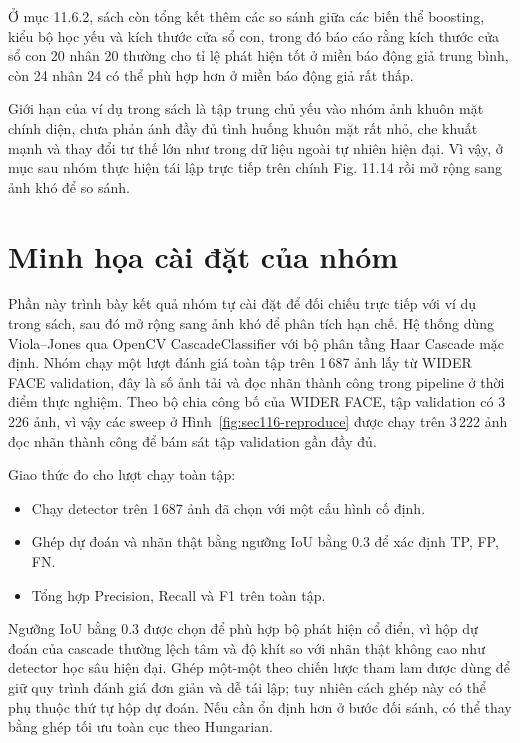 Ở mục 11.6.2, sách còn tổng kết thêm các so sánh giữa các biến thể boosting, kiểu bộ học yếu và kích thước cửa sổ con,
trong đó báo cáo rằng kích thước cửa sổ con 20 nhân 20 thường cho tỉ lệ phát hiện tốt ở miền báo động giả trung bình,
còn 24 nhân 24 có thể phù hợp hơn ở miền báo động giả rất thấp.  \cite{li2012facechapter}

Giới hạn của ví dụ trong sách là tập trung chủ yếu vào nhóm ảnh khuôn mặt chính diện,
chưa phản ánh đầy đủ tình huống khuôn mặt rất nhỏ, che khuất mạnh và thay đổi tư thế lớn như trong dữ liệu ngoài tự nhiên hiện đại.
Vì vậy, ở mục sau nhóm thực hiện tái lập trực tiếp trên chính Fig. 11.14 rồi mở rộng sang ảnh khó để so sánh.

\section{Minh họa cài đặt của nhóm}

Phần này trình bày kết quả nhóm tự cài đặt để đối chiếu trực tiếp với ví dụ trong sách, sau đó mở rộng sang ảnh khó để phân tích hạn chế.
Hệ thống dùng Viola--Jones qua OpenCV CascadeClassifier với bộ phân tầng Haar Cascade mặc định. \cite{viola2001rapid,viola2004robust,bradski2000opencv,opencv_cascade_docs}
Nhóm chạy một lượt đánh giá toàn tập trên 1\,687 ảnh lấy từ WIDER FACE validation, đây là số ảnh tải và đọc nhãn thành công trong pipeline ở thời điểm thực nghiệm. \cite{yang2016widerface,hf_widerface}
Theo bộ chia công bố của WIDER FACE, tập validation có 3\,226 ảnh, vì vậy các sweep ở Hình~\ref{fig:sec116-reproduce} được chạy trên 3\,222 ảnh đọc nhãn thành công để bám sát tập validation gần đầy đủ. \cite{yang2016widerface,hf_widerface}

Giao thức đo cho lượt chạy toàn tập:
\begin{itemize}
  \item Chạy detector trên 1\,687 ảnh đã chọn với một cấu hình cố định.
  \item Ghép dự đoán và nhãn thật bằng ngưỡng IoU bằng 0.3 để xác định TP, FP, FN.
  \item Tổng hợp Precision, Recall và F1 trên toàn tập.
\end{itemize}
Ngưỡng IoU bằng 0.3 được chọn để phù hợp bộ phát hiện cổ điển, vì hộp dự đoán của cascade thường lệch tâm và độ khít so với nhãn thật không cao như detector học sâu hiện đại.
Ghép một-một theo chiến lược tham lam được dùng để giữ quy trình đánh giá đơn giản và dễ tái lập; tuy nhiên cách ghép này có thể phụ thuộc thứ tự hộp dự đoán.
Nếu cần ổn định hơn ở bước đối sánh, có thể thay bằng ghép tối ưu toàn cục theo Hungarian.

